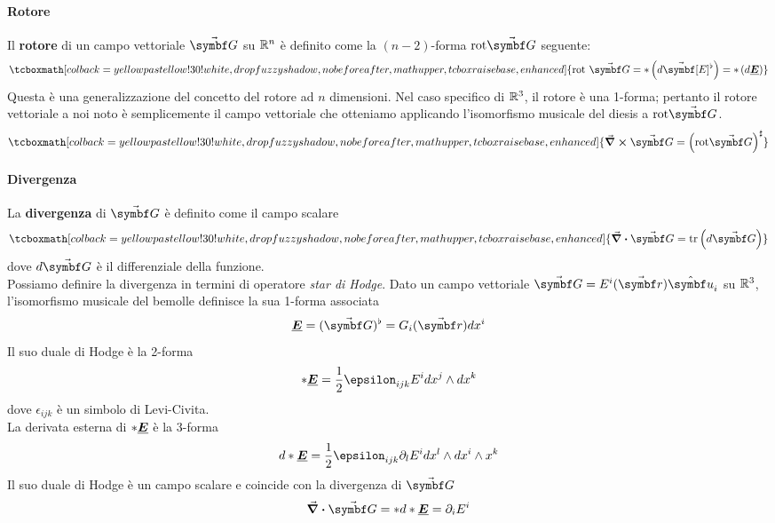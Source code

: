 \paragraph{Rotore}
Il \textbf{rotore} di un campo vettoriale $\vba{G}$ su $\mathbb{R}^n$ è definito come la $(n-2)$-forma $\mathrm{rot}\vba{G}$ seguente:
\begin{equation}
	\tcboxmath[colback=yellowpastellow!30!white,drop fuzzy shadow, nobeforeafter, math upper, tcbox raise base, enhanced]{\mathrm{rot}\ \vba{G}=\ast\left(d\vba[E]^\flat\right)=\ast\left(d\fb{E}\right)}
\end{equation}
Questa è una generalizzazione del concetto del rotore ad $n$ dimensioni. Nel caso specifico di $\mathbb{R}^3$, il rotore è una 1-forma; pertanto il rotore vettoriale a noi noto è semplicemente il campo vettoriale che otteniamo applicando l'isomorfismo musicale del diesis a $\mathrm{rot}\vba{G}$.
\begin{equation}
	\tcboxmath[colback=yellowpastellow!30!white,drop fuzzy shadow, nobeforeafter, math upper, tcbox raise base, enhanced]{\curl{\vba{G}}=\left(\mathrm{rot}\vba{G}\right)^\sharp}
\end{equation}
\paragraph{Divergenza}
La \textbf{divergenza} di $\vba{G}$ è definito come il campo scalare
\begin{equation}
	\tcboxmath[colback=yellowpastellow!30!white,drop fuzzy shadow, nobeforeafter, math upper, tcbox raise base, enhanced]{\div{\vba{G}}=\trc \left(d\vba{G}\right)}
\end{equation}
dove $d\vba{G}$ è il differenziale della funzione.\\
Possiamo definire la divergenza in termini di operatore \textit{star di Hodge}. Dato un campo vettoriale $\vba{G}=E^i(\vba{r})\vbh{u}_i$ su $\mathbb{R}^3$, l'isomorfismo musicale del bemolle definisce la sua 1-forma associata
\begin{equation*}
	\fb{E}=(\vba{G})^\flat=G_i(\vba{r})dx^i
\end{equation*}
Il suo duale di Hodge è la 2-forma
\begin{equation*}
	\ast\fb{E}=\frac{1}{2}\epsilon_{ijk}E^idx^j\wedge dx^k
\end{equation*}
dove $\epsilon_{ijk}$ è un simbolo di Levi-Civita.\\
La derivata esterna di $\ast\vb*{\underline{E}}$ è la 3-forma
\begin{equation*}
	d\ast\fb{E}=\frac{1}{2}\epsilon_{ijk}\partial_lE^idx^{l}\wedge dx^i\wedge x^k
\end{equation*}
Il suo duale di Hodge è un campo scalare e coincide con la divergenza di $\vba{G}$  
\begin{equation}
	\div{\vba{G}}=\ast d\ast\fb{E}=\partial_i E^i
\end{equation}
